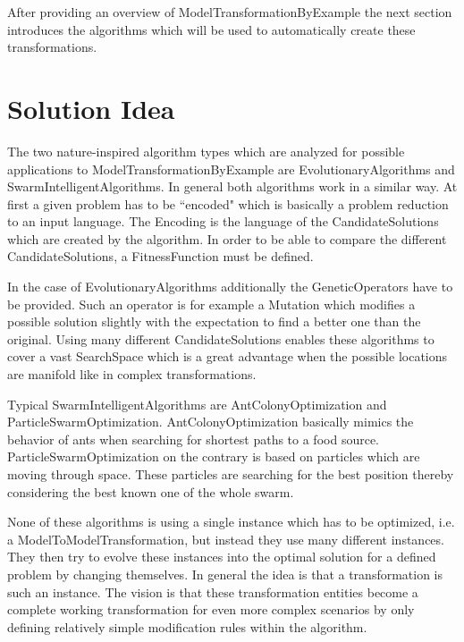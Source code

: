 After providing an overview of \gls{ModelTransformationByExample} the next section introduces the algorithms which will be used to automatically create these transformations.

\section{Solution Idea}
\label{secSolutionIdea}

The two nature-inspired algorithm types which are analyzed for possible applications to \gls{ModelTransformationByExample} are \glspl{EvolutionaryAlgorithm} and \glspl{SwarmIntelligentAlgorithm}. In general both algorithms work in a similar way. At first a given problem has to be ``encoded" which is basically a problem reduction to an input language. The \gls{Encoding} is the language of the \glspl{CandidateSolution} which are created by the algorithm. In order to be able to compare the different \glspl{CandidateSolution}, a \gls{FitnessFunction} must be defined. 

In the case of \glspl{EvolutionaryAlgorithm} additionally the \glspl{GeneticOperator} have to be provided. Such an operator is for example a \gls{Mutation} which modifies a possible solution slightly with the expectation to find a better one than the original. Using many different \glspl{CandidateSolution} enables these algorithms to cover a vast \gls{SearchSpace} which is a great advantage when the possible locations are manifold like in complex transformations. 

Typical \glspl{SwarmIntelligentAlgorithm} are \gls{AntColonyOptimization} and \gls{ParticleSwarmOptimization}. \Gls{AntColonyOptimization} basically mimics the behavior of ants when searching for shortest paths to a food source. \Gls{ParticleSwarmOptimization} on the contrary is based on particles which are moving through space. These particles are searching for the best position thereby considering the best known one of the whole swarm.

None of these algorithms is using a single instance which has to be optimized, i.e. a \gls{ModelToModelTransformation}, but instead they use many different instances. They then try to evolve these instances into the optimal solution for a defined problem by changing themselves. In general the idea is that a transformation is such an instance. The vision is that these transformation entities become a complete working transformation for even more complex scenarios by only defining relatively simple modification rules within the algorithm.

